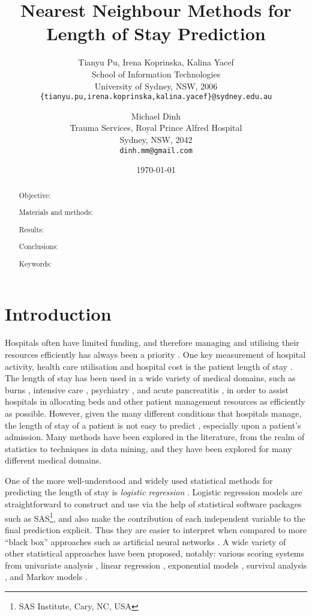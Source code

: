 \documentclass{article}
\title{Nearest Neighbour Methods for Length of Stay Prediction}
\author{
  Tianyu Pu, Irena Koprinska, Kalina Yacef\\
  School of Information Technologies\\
  University of Sydney, NSW, 2006\\
  \texttt{\{tianyu.pu,irena.koprinska,kalina.yacef\}@sydney.edu.au}
  \and
  Michael Dinh\\
  Trauma Services, Royal Prince Alfred Hospital\\
  Sydney, NSW, 2042\\
  \texttt{dinh.mm@gmail.com}
}
\date{\today}
\begin{document}
\maketitle

\renewcommand{\abstractname}{Summary}

\begin{abstract}
Objective:

Materials and methods:

Results:

Conclusions:

Keywords:

\end{abstract}

\section{Introduction}
Hospitals often have limited funding, and therefore managing and utilising
their resources efficiently has always been a priority \cite{Walczak2003}.
One key measurement of hospital activity, health care utilisation and hospital
cost is the patient length of stay \citep{Omachonu2004,Ng2006}.
The length of
stay has been used in a wide variety of medical domains, such as burns
 \citep{Yang2010}, intensive
care \citep{Tu1993,Harper2005,Perez2006,Dybowski1996},
psychiatry \citep{Lowell1997}, and acute pancreatitis \citep{Pofahl1998}, in
order to assist hospitals in allocating beds and other patient management
resources as efficiently as possible. However, given the many different
conditions that hospitals manage, the length of stay of a patient is
not easy to predict \citep{Walczak2003}, especially upon a patient's admission.
Many methods have been explored in the literature, from the realm of statistics
to techniques in data mining, and they have been explored for many different
medical domains.

One of the more well-understood and widely used statistical methods for
predicting the length of stay is \textit{logistic regression} \citep{Tu1996}.
Logistic regression models are straightforward to construct and use via the
help of statistical software packages such as
SAS\footnote{SAS Institute, Cary, NC, USA}, and
also make the contribution of each independent variable to the final
prediction explicit. Thus they are easier to interpret when compared to more
``black box'' approaches such as artificial neural networks \citep{Adams2012}.
A wide variety of other statistical approaches have been proposed, notably:
various scoring systems from univariate analysis \citep{Adams2012,Lavoie2005},
linear regression \citep{Yang2010}, exponential models \citep{Clark2007},
survival analysis \citep{Vasilakis2005}, and Markov
models \citep{Perez2006,Jain1989,Kapadia2000}.
\end{document}
